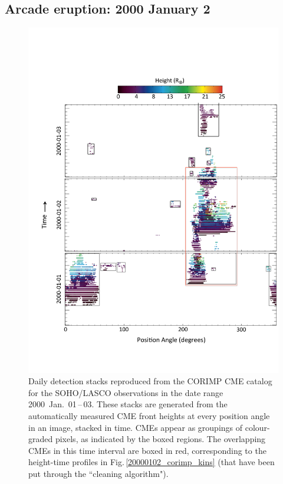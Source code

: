 \documentclass[referee,a4paper,12pt,traditabstract]{swsc}
\begin{document}
\begin{linenumbers}
\subsection{Arcade eruption: 2000 January 2}
\label{sect_20000102}

\begin{figure}[t]
\centerline{\includegraphics[scale=0.5, trim=20 70 0 140, clip=true]{images/pa_total.pdf}}
\caption{Daily detection stacks reproduced from the CORIMP CME catalog for the SOHO/LASCO observations in the date range 2000~Jan.~01\,--\,03. These stacks are generated from the automatically measured CME front heights at every position angle in an image, stacked in time. CMEs appear as groupings of colour-graded pixels, as indicated by the boxed regions. The overlapping CMEs in this time interval are boxed in red, corresponding to the height-time profiles in Fig.\,\ref{20000102_corimp_kins} (that have been put through the ``cleaning algorithm").}
\label{pa_total}
\end{figure}


\end{linenumbers}
\end{document}
